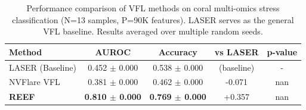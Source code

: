
\begin{table}[h]
\centering
\caption{Performance comparison of VFL methods on coral multi-omics stress classification (N=13 samples, P=90K features). LASER serves as the general VFL baseline. Results averaged over multiple random seeds.}
\label{tab:vfl_comparison}
\begin{tabular}{lcccc}
\toprule
\textbf{Method} & \textbf{AUROC} & \textbf{Accuracy} & \textbf{vs LASER} & \textbf{p-value} \\
\midrule
LASER (Baseline) & 0.452 $\pm$ 0.000 & 0.538 $\pm$ 0.000 & (baseline) & - \\
NVFlare VFL & 0.381 $\pm$ 0.000 & 0.462 $\pm$ 0.000 & -0.071 & nan \\
\textbf{REEF} & \textbf{0.810 $\pm$ 0.000} & \textbf{0.769 $\pm$ 0.000} & +0.357 & nan \\

\bottomrule
\end{tabular}
\end{table}
